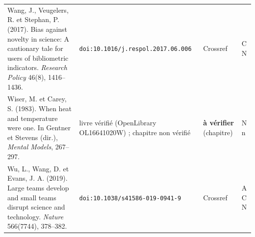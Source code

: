 \documentclass[a4paper,11pt]{article}
\begin{document}
{\begin{longtable}{@{}>{\raggedright\arraybackslash}p{8.7cm}>{\raggedright\arraybackslash}p{3.6cm}>{\raggedright\arraybackslash}p{2.1cm}>{\raggedright\arraybackslash}p{0.9cm}@{}}
Wang, J., Veugelers, R. et Stephan, P. (2017). Bias against novelty in science: A cautionary tale for users of bibliometric indicators. \emph{Research Policy} 46(8), 1416--1436. & \nolinkurl{doi:10.1016/j.respol.2017.06.006} & Crossref & C N\\
Wiser, M. et Carey, S. (1983). When heat and temperature were one. In Gentner et Stevens (dir.), \emph{Mental Models}, 267--297. & livre vérifié (OpenLibrary OL16641020W) ; chapitre non vérifié & \textbf{à vérifier} (chapitre) & N n\\
Wu, L., Wang, D. et Evans, J. A. (2019). Large teams develop and small teams disrupt science and technology. \emph{Nature} 566(7744), 378--382. & \nolinkurl{doi:10.1038/s41586-019-0941-9} & Crossref & A C N\\
\end{longtable}}
\end{document}
